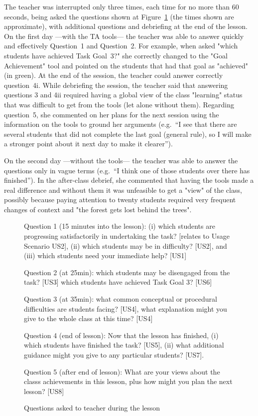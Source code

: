 The teacher was interrupted only three times, each time for no more
than 60 seconds, being asked the questions shown at
Figure~\ref{fig:summquest} (the
times shown are approximate), with additional questions and debriefing
at the end of the lesson. On the first day ---with the TA tools--- the
teacher was able to answer quickly and effectively Question~1 and
Question~2. For example, when asked "which students have achieved Task
Goal~3?" she correctly changed to the "Goal Achievement" tool and
pointed on the students that had that goal as "achieved" (in
green). At the end of the session, the teacher could answer correctly
question~4i. 
%
While debriefing the session, the teacher said that
answering questions 3 and 4ii required having a global view of the
class "learning" status that was difficult to get from the tools (let
alone without them).
%
Regarding question~5, she commented on her plans for the next session
using the information on the tools to ground her arguments (e.g.~``I
see that there are several students that did not complete the last
goal (general rule), so I will make a stronger point about it next day
to make it clearer'').

On the second day ---without the tools--- the teacher was able to
answer the questions only in vague terms (e.g.~``I think one of
those students over there has finished''). In the after-class debrief,
she commented that having the tools made a real difference and without
them it was unfeasible to get a "view" of the class, possibly because
paying attention to twenty students required very frequent changes of
context and "the forest gets lost behind the trees".

\begin{figure}[hbtp]
  \centering
  Question 1 (15 minutes into the lesson): (i) which students are
  progressing satisfactorily in undertaking the task? [relates to
  Usage Scenario US2], (ii) which students may be in difficulty?
  [US2], and (iii) which students need your immediate help? [US1]

  Question 2 (at 25min): which students may be disengaged from the task?
  [US3] which students have achieved Task Goal 3? [US6]

  Question 3 (at 35min): what common conceptual or procedural
  difficulties are students facing? [US4], what explanation might you
  give to the whole class at this time? [US4]

  Question 4 (end of lesson): Now that the lesson has finished,
  (i) which students have finished the task? [US5], (ii) what
  additional guidance might you give to any particular students?
  [US7].

  Question 5 (after end of lesson): What are your views about the
  classs achievements in this lesson, plus how might you plan the next
  lesson? [US8]
  \caption{Questions asked to teacher during the lesson}
  \label{fig:summquest}
\end{figure}




